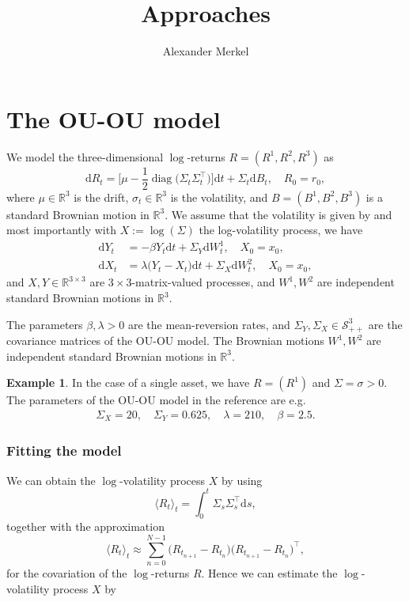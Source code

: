 \documentclass[11pt]{article}
\title{Approaches}
\author{Alexander Merkel}
\newcommand{\R}{\mathbb{R}}
\newcommand{\cS}{\mathcal{S}}
\newcommand{\rd}{\mathrm{d}}
\DeclareMathOperator{\diag}{diag}
\theoremstyle{plain}
\theoremstyle{definition}
\newtheorem{example}[theorem]{Example}
\begin{document}
\maketitle

\section{The OU-OU model}
We model the three-dimensional $\log$-returns $R = (R^{1},R^{2},R^{3})$ as
\begin{equation}
    \rd R_{t} = \bigl[\mu - \frac{1}{2} \diag\bigl(\Sigma_{t}\Sigma_{t}^{\top}\bigr)\bigr] \rd t 
    + \Sigma_{t} \rd B_{t},\quad R_{0} = r_{0},
\end{equation}
where $\mu\in \R^{3}$ is the drift, $\sigma_{t} \in \R^{3}$ is the volatility, and $B = (B^{1},B^{2},B^{3})$ is a standard Brownian motion in $\R^{3}$. We assume that the volatility is given by
and most importantly with $X :=\log(\Sigma)$ the log-volatility process, we have
\begin{align*}
    \rd Y_{t} &= - \beta Y_{t} \rd t + \Sigma_{Y}\rd W^{1}_{t}, \quad X_{0} = x_{0},\\
    \rd X_{t} &= \lambda\bigl( Y_{t} - X_{t}\bigr) \rd t + \Sigma_{X}\rd W^{2}_{t},
    \quad X_{0} = x_{0},
\end{align*}
and $X, Y \in \R^{3 \times 3}$ are $3\times 3$-matrix-valued processes, and $W^{1}, W^{2}$
are independent standard Brownian motions in $\R^{3}$.

The parameters $\beta, \lambda > 0$ are the mean-reversion rates,
and $\Sigma_{Y}, \Sigma_{X} \in \cS_{++}^{3}$ are the covariance matrices of the OU-OU model.
The Brownian motions $W^{1}, W^{2}$ are independent standard Brownian motions in $\R^{3}$.

\begin{example}
    In the case of a single asset, we have $R = (R^{1})$ and $\Sigma = \sigma > 0$.
    The parameters of the OU-OU model in the reference are e.g.
    \begin{align*}
        \Sigma_{X} = 20,\quad
        \Sigma_{Y} = 0.625,\quad
        \lambda = 210,\quad
        \beta = 2.5.
    \end{align*}
\end{example}

\subsubsection*{Fitting the model}
We can obtain the $\log$-volatility process $X$ by using
\begin{equation}
    \langle R_{t} \rangle_{t} 
    = \int_{0}^{t} \Sigma_{s}\Sigma_{s}^{\top} \rd s,
\end{equation}
together with the approximation
\begin{equation}
    \langle R_{t} \rangle_{t} \approx \sum_{n=0}^{N-1} \bigl(R_{t_{n+1}} - R_{t_{n}}\bigr)\bigl(R_{t_{n+1}} - R_{t_{n}}\bigr)^{\top},
\end{equation}
for the covariation of the $\log$-returns $R$.
Hence we can estimate the $\log$-volatility process $X$ by
\end{document}

